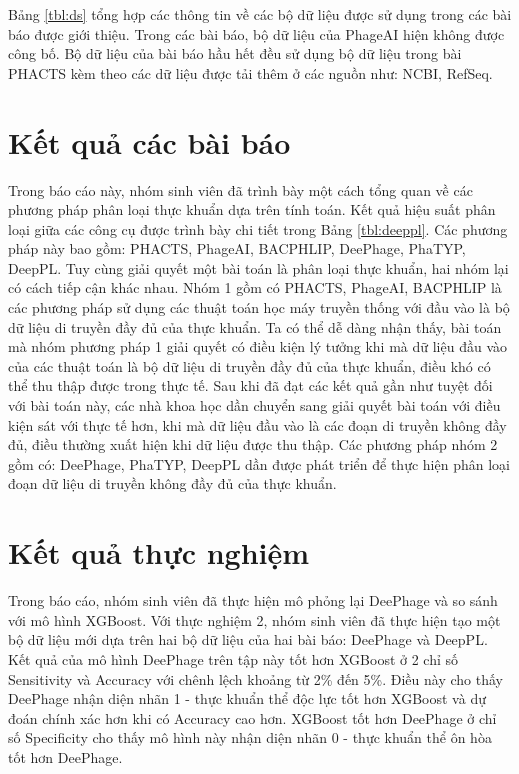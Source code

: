 
Bảng \ref{tbl:ds} tổng hợp các thông tin về các bộ dữ liệu được sử dụng trong các bài báo được giới thiệu. Trong các bài báo, bộ dữ liệu của PhageAI hiện không được công bố. Bộ dữ liệu của bài báo hầu hết đều sử dụng bộ dữ liệu trong bài PHACTS kèm theo các dữ liệu được tải thêm ở các nguồn như: NCBI, RefSeq.

\section{Kết quả các bài báo}

Trong báo cáo này, nhóm sinh viên đã trình bày một cách tổng quan về các phương pháp phân loại thực khuẩn dựa trên tính toán. Kết quả hiệu suất phân loại giữa các công cụ được trình bày chi tiết trong Bảng \ref{tbl:deeppl}. Các phương pháp này bao gồm: PHACTS, PhageAI, BACPHLIP, DeePhage, PhaTYP, DeepPL. Tuy cùng giải quyết một bài toán là phân loại thực khuẩn, hai nhóm lại có cách tiếp cận khác nhau. Nhóm 1 gồm có PHACTS, PhageAI, BACPHLIP là các phương pháp sử dụng các thuật toán học máy truyền thống với đầu vào là bộ dữ liệu di truyền đầy đủ của thực khuẩn. Ta có thể dễ dàng nhận thấy, bài toán mà nhóm phương pháp 1 giải quyết có điều kiện lý tưởng khi mà dữ liệu đầu vào của các thuật toán là bộ dữ liệu di truyền đầy đủ của thực khuẩn, điều khó có thể thu thập được trong thực tế. Sau khi đã đạt các kết quả gần như tuyệt đối với bài toán này, các nhà khoa học dần chuyển sang giải quyết bài toán với điều kiện sát với thực tế hơn, khi mà dữ liệu đầu vào là các đoạn di truyền không đầy đủ, điều thường xuất hiện khi dữ liệu được thu thập. Các phương pháp nhóm 2 gồm có: DeePhage, PhaTYP, DeepPL dần được phát triển để thực hiện phân loại đoạn dữ liệu di truyền không đầy đủ của thực khuẩn.

\section{Kết quả thực nghiệm}
Trong báo cáo, nhóm sinh viên đã thực hiện mô phỏng lại DeePhage và so sánh với mô hình XGBoost. Với thực nghiệm 2, nhóm sinh viên đã thực hiện tạo một bộ dữ liệu mới dựa trên hai bộ dữ liệu của hai bài báo: DeePhage\cite{wu2021deephage} và DeepPL\cite{zhang2024deeppl}. Kết quả của mô hình DeePhage trên tập này tốt hơn XGBoost ở 2 chỉ số Sensitivity và Accuracy với chênh lệch khoảng từ 2\% đến 5\%. Điều này cho thấy DeePhage nhận diện nhãn 1 - thực khuẩn thể độc lực tốt hơn XGBoost và dự đoán chính xác hơn khi có Accuracy cao hơn. XGBoost tốt hơn DeePhage ở chỉ số Specificity cho thấy mô hình này nhận diện nhãn 0 - thực khuẩn thể ôn hòa tốt hơn DeePhage.

